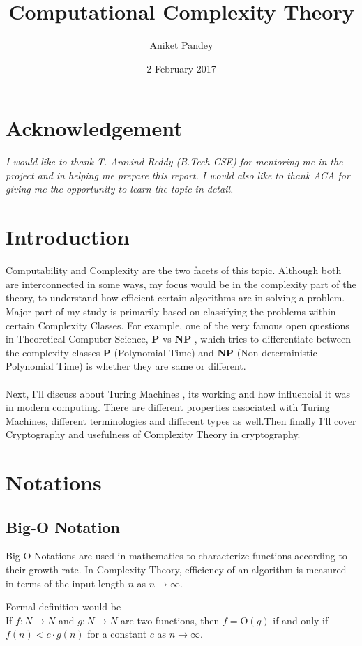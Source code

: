 \documentclass[12pt,a4paper]{extarticle}
\title{\textbf{Computational Complexity Theory}}
\date{2 February 2017}
\author{Aniket Pandey}
\begin{document}
\maketitle

\section{Acknowledgement}
\textit{I would like to thank T. Aravind Reddy (B.Tech CSE) for mentoring me in the project and in helping me prepare this report. I would also like to thank ACA for giving me the opportunity to learn the topic in detail.}

\section{Introduction}
Computability and Complexity are the two facets of this topic. Although both are interconnected in some ways, my focus would be in the complexity part of the theory, to understand how efficient certain algorithms are in solving a problem. Major part of my study is primarily based on classifying the problems within certain Complexity Classes. For example, one of the very famous open questions in Theoretical Computer Science, \textbf{P} vs \textbf{NP} , which tries to differentiate between the complexity classes \textbf{P} (Polynomial Time) and \textbf{NP} (Non-deterministic Polynomial Time) is whether they are same or different.\\\\Next, I'll discuss about Turing Machines , its working and how influencial it was in modern computing. There are different properties associated with Turing Machines, different terminologies and different types as well.Then finally I'll cover Cryptography and usefulness of Complexity Theory in cryptography. 

\section{Notations}
\subsection{Big-O Notation}
Big-O Notations are used in mathematics to characterize functions according to their growth rate. In Complexity Theory, efficiency of an algorithm is measured in terms of the input length $n$ as $n\rightarrow \infty $.\par Formal definition would be\\If $f:N\rightarrow N$ and $g:N\rightarrow N$ are two functions, then $f=$O$(g)$ if and only if $f(n)<c \cdot g(n)$ for a constant $c$ as $n\rightarrow\infty$.
\newpage
\end{document}
